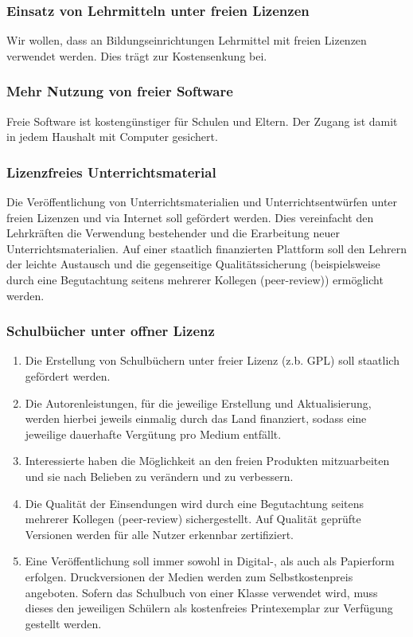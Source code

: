 \label{wp:bildung:lehrmittel1}

\subsubsection{Einsatz von Lehrmitteln unter freien Lizenzen}
\abstimmung
Wir wollen, dass an Bildungseinrichtungen Lehrmittel mit freien Lizenzen verwendet werden. Dies trägt zur Kostensenkung bei.

\subsubsection{Mehr Nutzung von freier Software}
\abstimmung
Freie Software ist kostengünstiger für Schulen und Eltern. Der Zugang ist damit in jedem Haushalt mit Computer gesichert.
 
\newpage
{}\label{wp:bildung:lehrmittel2}

\subsubsection{Lizenzfreies Unterrichtsmaterial}
\abstimmung
Die Veröffentlichung von Unterrichtsmaterialien und Unterrichtsentwürfen unter freien Lizenzen und via Internet soll gefördert werden. Dies vereinfacht den Lehrkräften die Verwendung bestehender und die Erarbeitung neuer Unterrichtsmaterialien. Auf einer staatlich finanzierten Plattform soll den Lehrern der leichte Austausch und die gegenseitige Qualitätssicherung (beispielsweise durch eine Begutachtung seitens mehrerer Kollegen (peer-review)) ermöglicht werden.

\subsubsection{Schulbücher unter offner Lizenz}
\abstimmung
\begin{enumerate}
\item Die Erstellung von Schulbüchern unter freier Lizenz (z.b. GPL) soll staatlich gefördert werden.
\item Die Autorenleistungen, für die jeweilige Erstellung und Aktualisierung, werden hierbei jeweils einmalig durch das Land finanziert, sodass eine jeweilige dauerhafte Vergütung pro Medium entfällt.
\item Interessierte haben die Möglichkeit an den freien Produkten mitzuarbeiten und sie nach Belieben zu verändern und zu verbessern.
\item Die Qualität der Einsendungen wird durch eine Begutachtung seitens mehrerer Kollegen (peer-review) sichergestellt. Auf Qualität geprüfte Versionen werden für alle Nutzer erkennbar zertifiziert.
\item Eine Veröffentlichung soll immer sowohl in Digital-, als auch als Papierform erfolgen. Druckversionen der Medien werden zum Selbstkostenpreis angeboten. Sofern das Schulbuch von einer Klasse verwendet wird, muss dieses den jeweiligen Schülern als kostenfreies Printexemplar zur Verfügung gestellt werden.
\end{enumerate} 

